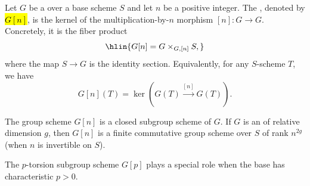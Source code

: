\begin{definition} \label{definition:torsion_subgroup_scheme_of_a_group_scheme}
    Let $G$ be a  over a base scheme $S$ and let $n$ be a positive integer.
    The , denoted by \hl{$G[n]$}, is the kernel of the multiplication-by-$n$ morphism $[n]\colon G \to G$. Concretely, it is the fiber product
    $$\hlin{G[n] = G \times_{G, [n]} S,}$$
    where the map $S \to G$ is the identity section. Equivalently, for any $S$-scheme $T$, we have
    $$G[n](T) = \ker(G(T) \xrightarrow{[n]} G(T)).$$

    The group scheme $G[n]$ is a closed subgroup scheme of $G$. If $G$ is an  of relative dimension $g$, then $G[n]$ is a finite  commutative group scheme over $S$ of rank $n^{2g}$ (when $n$ is invertible on $S$). 

    The $p$-torsion subgroup scheme $G[p]$ plays a special role when the base has characteristic $p > 0$.


\end{definition}